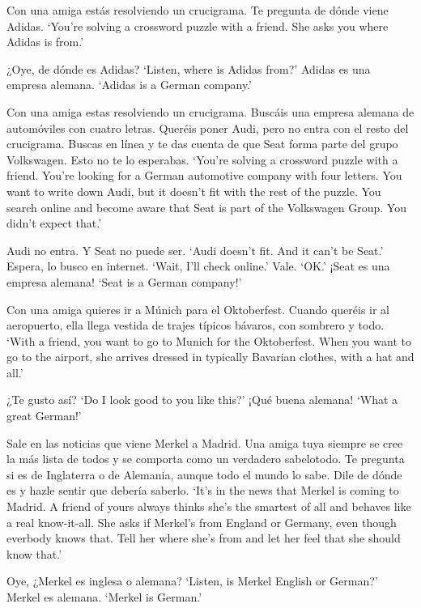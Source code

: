 \begin{exe}
\ex \label{ex:experimentoNEUTRALDECLalemana}
	Con una amiga estás resolviendo un crucigrama. Te pregunta de dónde viene Adidas. 
	\glt `You're solving a crossword puzzle with a friend. She asks you where Adidas is from.'
	\begin{xlist}[A:]
	 ¿Oye, de dónde es Adidas? \href{https://osf.io/f6m5g/}{\faVolumeUp}
	\glt `{Listen, where is Adidas from?}' 
	 Adidas es una empresa alemana.
	\glt `{Adidas is a German company.}'
	\end{xlist}
\ex \label{ex:experimentoMIRDECLalemana}
	Con una amiga estas resolviendo un crucigrama. Buscáis una empresa alemana de automóviles con cuatro letras. Queréis poner Audi, pero no entra con el resto del crucigrama. Buscas en línea y te das cuenta de que Seat forma parte del grupo Volkswagen. Esto no te lo esperabas. 
\glt `{You're solving a crossword puzzle with a friend. You're looking for a German automotive company with four letters. You want to write down Audi, but it doesn't fit with the rest of the puzzle. You search online and become aware that Seat is part of the Volkswagen Group. You didn't expect that.}' 
\begin{xlist}[A:]
 Audi no entra. Y Seat no puede ser. \href{https://osf.io/nxywh/}{\faVolumeUp} 
\glt `{Audi doesn't fit. And it can't be Seat.}' 
 Espera, lo busco en internet. 
\glt `{Wait, I'll check online.}' 
 Vale. \href{https://osf.io/bgezq/}{\faVolumeUp} 
\glt `{OK.}' 
 ¡Seat es una empresa alemana! 
\glt `{Seat is a German company!}' 
\end{xlist}

\ex \label{ex:experimentoEXCLalemana}
Con una amiga quieres ir a Múnich para el Oktoberfest. Cuando queréis ir al aeropuerto, ella llega vestida de trajes típicos bávaros, con sombrero y todo. 
\glt `{With a friend, you want to go to Munich for the Oktoberfest. When you want to go to the airport, she arrives dressed in typically Bavarian clothes, with a hat and all.}' 
\begin{xlist}[A:]
 ¿Te gusto así? \href{https://osf.io/ghxn2/}{\faVolumeUp} 
\glt `{Do I look good to you like this?}' 
 ¡Qué buena alemana!  
\glt `{What a great German!}' 
\end{xlist}

\ex \label{ex:experimentoOBVASSalemana}
Sale en las noticias que viene Merkel a Madrid. Una amiga tuya siempre se cree la más lista de todos y se comporta como un verdadero sabelotodo. Te pregunta si es de Inglaterra o de Alemania, aunque todo el mundo lo sabe. Dile de dónde es y hazle sentir que debería saberlo. 
\glt `{It's in the news that Merkel is coming to Madrid. A friend of yours always thinks she's the smartest of all and behaves like a real know-it-all. She asks if Merkel's from England or Germany, even though everbody knows that. Tell her where she's from and let her feel that she should know that.}' 
\begin{xlist}[A:]
 Oye, ¿Merkel es inglesa o alemana? \href{https://osf.io/bx2hw/}{\faVolumeUp}
\glt `{Listen, is Merkel English or German?}' 
 Merkel es alemana. 
\glt `{Merkel is German.}' 
\end{xlist}


\end{exe}
